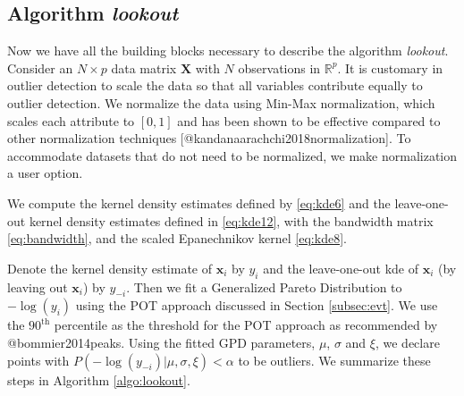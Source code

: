 \documentclass[
]{article}
\begin{document}
\hypertarget{algorithm-lookout}{%
\subsection{\texorpdfstring{Algorithm
\emph{lookout}}{Algorithm lookout}}\label{algorithm-lookout}}

Now we have all the building blocks necessary to describe the algorithm
\emph{lookout}. Consider an \(N \times p\) data matrix \(\bm{X}\) with
\(N\) observations in \(\mathbb{R}^p\). It is customary in outlier
detection to scale the data so that all variables contribute equally to
outlier detection. We normalize the data using Min-Max normalization,
which scales each attribute to \([0, 1]\) and has been shown to be
effective compared to other normalization techniques
{[}@kandanaarachchi2018normalization{]}. To accommodate datasets that do
not need to be normalized, we make normalization a user option.

We compute the kernel density estimates defined by \eqref{eq:kde6} and
the leave-one-out kernel density estimates defined in \eqref{eq:kde12},
with the bandwidth matrix \eqref{eq:bandwidth}, and the scaled
Epanechnikov kernel \eqref{eq:kde8}.

Denote the kernel density estimate of \(\bm{x}_i\) by \(y_i\) and the
leave-one-out kde of \(\bm{x}_i\) (by leaving out \(\bm{x}_i\)) by
\(y_{-i}\). Then we fit a Generalized Pareto Distribution to
\(-\log(y_i)\) using the POT approach discussed in Section
\ref{subsec:evt}. We use the \(90^{\text{th}}\) percentile as the
threshold for the POT approach as recommended by @bommier2014peaks.
Using the fitted GPD parameters, \(\mu\), \(\sigma\) and \(\xi\), we
declare points with
\(P\left(-\log(y_{-i})|\mu, \sigma,\xi \right) < \alpha\) to be
outliers. We summarize these steps in Algorithm \ref{algo:lookout}.
\end{document}
